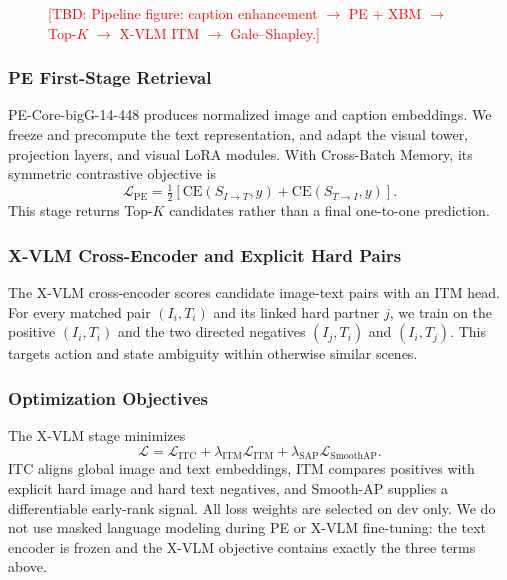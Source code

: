 \documentclass[runningheads]{llncs}
\newcommand{\todo}[1]{\textcolor{red}{[TBD: #1]}}
\begin{document}
\begin{figure}[t]
  \centering
  \fbox{\rule{0pt}{1.1in}\rule{0.95\linewidth}{0pt}}
  \caption{\todo{Pipeline figure: caption enhancement $\rightarrow$ PE + XBM $\rightarrow$
  Top-$K$ $\rightarrow$ X-VLM ITM $\rightarrow$ Gale--Shapley.}}
  \label{fig:pipeline}
\end{figure}

\subsubsection{PE First-Stage Retrieval}
PE-Core-bigG-14-448 produces normalized image and caption embeddings. We freeze and precompute
the text representation, and adapt the visual tower, projection layers, and visual LoRA modules.
With Cross-Batch Memory, its symmetric contrastive objective is
\begin{equation}
\mathcal{L}_{\mathrm{PE}}=\tfrac{1}{2}\left[
\mathrm{CE}(S_{I\rightarrow T}, y)+\mathrm{CE}(S_{T\rightarrow I}, y)\right].
\end{equation}
This stage returns Top-$K$ candidates rather than a final one-to-one prediction.

\subsubsection{X-VLM Cross-Encoder and Explicit Hard Pairs}
The X-VLM cross-encoder scores candidate image-text pairs with an ITM head. For every matched
pair $(I_i,T_i)$ and its linked hard partner $j$, we train on the positive $(I_i,T_i)$ and the two
directed negatives $(I_j,T_i)$ and $(I_i,T_j)$. This targets action and state ambiguity within
otherwise similar scenes.

\subsubsection{Optimization Objectives}
The X-VLM stage minimizes
\begin{equation}
\mathcal{L}=\mathcal{L}_{\mathrm{ITC}}+
\lambda_{\mathrm{ITM}}\mathcal{L}_{\mathrm{ITM}}+
\lambda_{\mathrm{SAP}}\mathcal{L}_{\mathrm{SmoothAP}}.
\end{equation}
ITC aligns global image and text embeddings, ITM compares positives with explicit hard image and
hard text negatives, and Smooth-AP supplies a differentiable early-rank signal. All loss weights
are selected on dev only. We do not use masked language modeling during PE or X-VLM fine-tuning:
the text encoder is frozen and the X-VLM objective contains exactly the three terms above.
\end{document}
